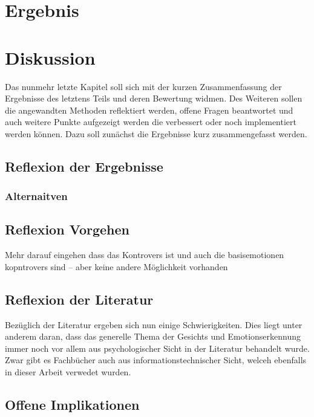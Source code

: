 \documentclass[12pt, a4paper]{scrbook}
\begin{document}
\let\cleardoublepage\relax
\chapter{Ergebnis}

\let\cleardoublepage\relax
\chapter{Diskussion}
Das nunmehr letzte Kapitel soll sich mit der kurzen Zusammenfassung der Ergebnisse des letztens Teils und deren Bewertung widmen. Des Weiteren sollen die angewandten Methoden reflektiert werden,
offene Fragen beantwortet und auch weitere Punkte aufgezeigt werden die verbessert oder noch implementiert werden können. Dazu soll zunächst die Ergebnisse kurz zusammengefasst werden.
\section{Reflexion der Ergebnisse}
\subsection{Alternaitven}
\section{Reflexion Vorgehen}
Mehr darauf eingehen dass das Kontrovers ist und auch die basisemotionen kopntrovers sind --  aber keine andere Möglichkeit vorhanden 
\section{Reflexion der Literatur}
Bezüglich der Literatur ergeben sich nun einige Schwierigkeiten. Dies liegt unter anderem daran, dass das generelle Thema der Gesichts und Emotionserkennung immer noch vor allem aus
psychologischer Sicht in der Literatur behandelt wurde. Zwar gibt es Fachbücher auch aus informationstechnischer Sicht, welceh ebenfalls in dieser Arbeit verwedet wurden.
\section{Offene Implikationen}


\let\cleardoublepage\relax
\pagestyle{empty}
\newpage
\pagestyle{empty}
\printbibheading
\printbibliography[type=book,heading=subbibliography,title={Literaturquellen}]
\printbibliography[type=misc,heading=subbibliography,title={Sonstige Quellen}]
\pagestyle{empty}
\newpage
\pagestyle{empty}
\end{document}
